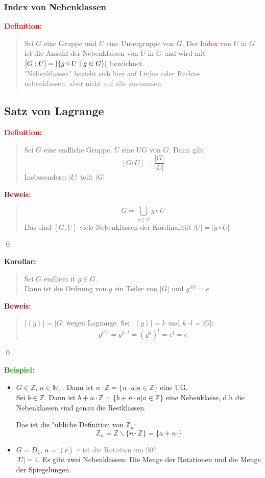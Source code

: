 \documentclass{article}
\newcommand{\smsp}{\phantom{\hspace{3px}}}
\newcommand{\red}[1]{\textcolor{red}{#1}}
\newcommand{\gray}[1]{\textcolor{gray}{#1}}
\newcommand{\green}[1]{\textcolor{green}{#1}}
\newcommand{\dgr}[1]{\textcolor{dgr}{#1}}
\newcommand{\maroon}[1]{\textcolor{maroon}{#1}}
\newcommand{\ex}{\green{\textbf{Beispiel: }}}
\newcommand{\de}[1]{\red{\textbf{Definition: }}\begin{quote}#1\end{quote}}
\newcommand{\co}[1]{\dgr{\textbf{Korollar: }}\begin{quote}#1\end{quote}}
\newcommand{\pr}[1]{\maroon{\textbf{Beweis: }}\begin{quote}#1\end{quote}\qed}
\newcommand{\N}{\mathbb{N}}
\newcommand{\Z}{\mathbb{Z}}
\renewcommand{\st}{\smsp | \smsp}
\newcommand{\spann}[1]{\left\langle#1\right\rangle}
\begin{document}
\subsubsection{Index von Nebenklassen}

\de{
    Sei $G$ eine Gruppe und $U$ eine Untergruppe von $G$. Der \red{Index} von $U$ in $G$ ist die Anzahl der Nebenklassen von $U$ in $G$ und wird mit $[G:U] = |\{g \circ U \st g \in G\}|$ bezeichnet.\\
    \gray{"Nebenklassen" bezieht sich hier auf Links- oder Rechts-\\
    nebenklassen, aber nicht auf alle zusammen}
}

\subsection{Satz von Lagrange}

\de{
    Sei $G$ eine endliche Gruppe, $U$ eine UG von $G$. Dann gilt:
    \[
        [G:U] = \frac{|G|}{|U|}
    \]
    Insbesondere: $|U|$ teilt $|G|$
}

\pr{
    $$G = \bigcup_{g \in G} g \circ U$$
    Das sind $[G:U]$-viele Nebenklassen der Kardinalität $|U| = |g \circ U|$
}

\co{
    Sei $G$ endlicm it $g \in G$.\\
    Dann ist  die Ordnung von $g$ ein Teiler von $|G|$ und $g^{|G|} = e$
}

\pr{
    $|\spann{g}| = |G|$ wegen Lagrange. Sei $|\spann{g}| = k$ und $k \cdot l = |G|$:
    \[
        g^{|G|} = g^{k \cdot l} = (g^k)^l = e^l = e
    \]
}

\ex \begin{itemize}
    \item $G \in \Z$, $n \in \N_+$. Dann ist $n \cdot \Z = \{n \cdot a | a \in \Z\}$ eine UG.\\
    Sei $b \in \Z$. Dann ist $b + n \cdot \Z = \{b + n \cdot a | a \in \Z\}$ eine Nebenklasse, d.h die Nebenklassen sind genau die Restklassen.

    Das ist die "übliche Definition von $\Z_n$:
    \[
        \Z_n = \Z \backslash \{n \cdot \Z\} = \{a + n \cdot\}
    \]
    \item $G = D_4$, $u = \spann{r}$ \gray{$r$ ist die Rotation um $90$°}\\
    $|U| = 4$. Es gibt zwei Nebenklassen: Die Menge der Rotationen und die Menge der Spiegelungen.
\end{itemize}
\end{document}
